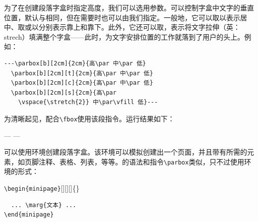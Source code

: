 为了在创建段落字盒时指定高度，我们可以选用参数。可以控制字盒中文字的垂直位置，默认与相同，但在需要时也可以由我们指定。一般地，它可以取以表示居中、取或以分别表示靠上和靠下。此外，它还可以取，表示将文字拉伸（英：strech）填满整个字盒——此时，为文字安排位置的工作就落到了用户的头上。例如：

\begin{dmd}
\begin{verbatim}
---\parbox[b][2cm]{2cm}{高\par 中\par 低}
  \parbox[b][2cm][t]{2cm}{高\par 中\par 低}
  \parbox[b][2cm][c]{2cm}{高\par 中\par 低}
  \parbox[b][2cm][s]{2cm}{高\par
    \vspace{\stretch{2}} 中\par\vfill 低}---
\end{verbatim}
\end{dmd}

为清晰起见，配合\verb|\fbox|使用该段指令。运行结果如下：

---
  ---

可以使用环境创建段落字盒。该环境可以模拟创建出一个页面，并且带有所需的元素，如页脚注释、表格、列表，等等。的语法和指令\verb|\parbox|类似，只不过使用环境的形式：

\begin{dmd}
\verb+\begin{minipage}+[][][]\{\}
\begin{verbatim}
  ... \marg{文本} ...
\end{minipage}
\end{verbatim}
\end{dmd}

